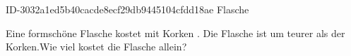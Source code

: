 \begin{exercise}
      {ID-3032a1ed5b40cacde8ecf29db9445104cfdd18ae}
      {Flasche}
  \ifproblem\problem\par
    Eine formschöne Flasche kostet mit Korken . Die Flasche ist um
     teurer als der Korken.Wie viel kostet die Flasche allein?
  \fi
\end{exercise}

